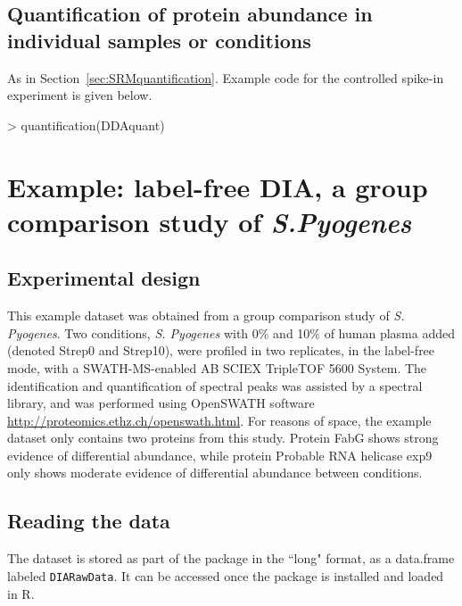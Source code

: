 \documentclass[11pt]{article}
\def\secref#1{Section~\ref{sec:#1}}
\begin{document}
\subsection{Quantification of protein abundance in individual samples or conditions}

As in \secref{SRMquantification}. Example code for the controlled spike-in experiment is given below.

\begin{small}
\begin{Schunk}
\begin{Sinput}
> quantification(DDAquant)
\end{Sinput}
\end{Schunk}
\end{small}




\clearpage
\section{Example: label-free DIA, a group comparison study of {\it S.Pyogenes}}

\subsection{Experimental design}

This example dataset was obtained from a group comparison study of {\it S. Pyogenes}. Two conditions, {\it S. Pyogenes} with 0\% and 10\% of human plasma added (denoted Strep0 and Strep10), were profiled in two replicates, in the label-free mode, with a SWATH-MS-enabled AB SCIEX TripleTOF 5600 System. The identification and quantification of spectral peaks was assisted by a spectral library, and was performed using OpenSWATH software \url{http://proteomics.ethz.ch/openswath.html}. For reasons of space, the example dataset only contains two proteins from this study. Protein FabG shows strong evidence of differential abundance, while protein Probable RNA helicase exp9 only shows moderate evidence of differential abundance between conditions.

\subsection{Reading the data}

The dataset is stored as part of the package in the ``long" format, as a data.frame labeled {\tt DIARawData}. It can be accessed once the package is installed and loaded in R.
\end{document}
